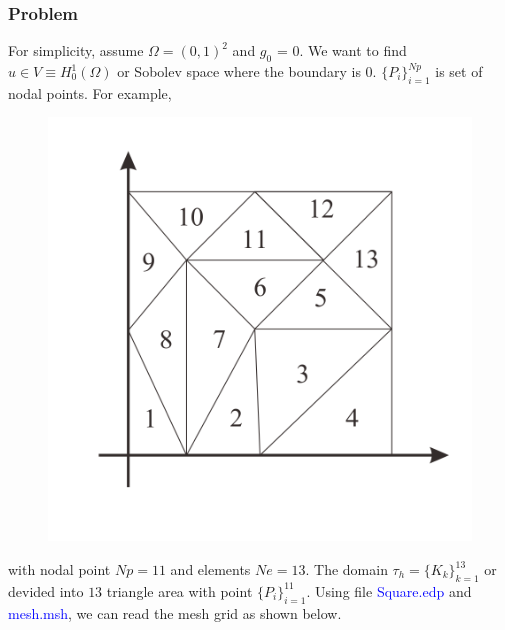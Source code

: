 \documentclass[a4paper,10pt]{article}
\begin{document}
\subsubsection{Problem}
For simplicity, assume $ \Omega = (0,1)^2 $ and $ g_{0} $ = 0. We want to find $ u \in V \equiv H_{0}^{1}(\Omega) $ or Sobolev space where the boundary is $ 0 $. $ \{ P_{i} \}_{i=1}^{Np} $ is set of nodal points. For example,

\begin{figure}[h!]
	\centering
	\includegraphics[width=0.5\linewidth]{picture/problem}
	\caption{}
	\label{fig:problem}
\end{figure}
with nodal point $ Np =11 $ and elements $ Ne =13 $.  The domain $ \tau_{h}= \{K_{k}\}_{k=1}^{13} $ or devided into $ 13 $ triangle area with point $ \{P_{i}\}_{i=1}^{11} $. Using file \textcolor{blue}{Square.edp} and \textcolor{blue}{mesh.msh}, we can read the mesh grid as shown below.
\end{document}
